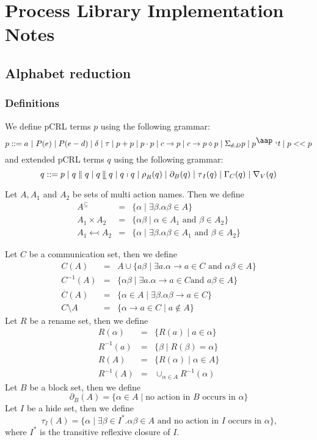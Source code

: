 \documentclass{article}
\begin{document}
\section{Process Library Implementation Notes}

\subsection{Alphabet reduction}

\subsubsection{Definitions}

We define pCRL terms $p$ using the following grammar:%
\[
p::=a\ \mathbf{|}\ P(e)\mid P(e-d)\mid \delta \mid \tau \mid p+p\mid p\cdot
p\mid c\rightarrow p\mid c\rightarrow p\diamond p\mid \Sigma _{d:D}p\mid p^{%
\mathbin{\mbox{\aap ,}}}t\mid p<<p 
\]%
and extended pCRL terms $q$ using the following grammar:%
\[
q::=p\mid q\parallel q\mid q\mathbin{\mathrel{\llfloor}}q\mid q\shortmid
q\mid \rho _{R}(q)\mid \partial _{B}(q)\mid \tau _{I}(q)\mid \Gamma
_{C}(q)\mid \nabla _{V}(q) 
\]

Let $A,A_{1}$ and $A_{2}$ be sets of multi action names. Then we define%
\begin{eqnarray*}
A^{\subseteq } &=&\{\alpha \mid \exists \beta .\alpha \beta \in A\} \\
A_{1}\times A_{2} &=&\{\alpha \beta \mid \alpha \in A_{1}\text{ and }\beta
\in A_{2}\} \\
A_{1}\leftarrowtail A_{2} &=&\{\alpha \mid \exists \beta .\alpha \beta \in
A_{1}\text{ and }\beta \in A_{2}\}
\end{eqnarray*}

Let $C$ be a communication set, then we define%
\begin{eqnarray*}
C(A) &=&A\cup \{a\beta \mid \exists a.\alpha \rightarrow a\in C\text{ and }%
\alpha \beta \in A\} \\
C^{-1}(A) &=&\{\alpha \beta \mid \exists a.\alpha \rightarrow a\in C\text{
and }a\beta \in A\} \\
\overline{C}(A) &=&\{\alpha \in A\mid \exists \beta .\alpha \beta
\rightarrow a\in C\} \\
C\setminus A &=&\{\alpha \rightarrow a\in C\mid a\notin A\}
\end{eqnarray*}%
Let $R$ be a rename set, then we define%
\begin{eqnarray*}
R(\alpha ) &=&\{R(a)\mid a\in \alpha \} \\
R^{-1}(a) &=&\{\beta \mid R(\beta )=\alpha \} \\
R(A) &=&\{R(\alpha )\mid \alpha \in A\} \\
R^{-1}(A) &=&\cup _{\alpha \in A}R^{-1}(\alpha )
\end{eqnarray*}%
Let $B$ be a block set, then we define%
\[
\partial _{B}(A)=\{\alpha \in A\mid \text{no action in }B\text{ occurs in }%
\alpha \} 
\]%
Let $I$ be a hide set, then we define%
\[
\tau _{I}(A)=\{\alpha \mid \exists \beta \in I^{\ast }.\alpha \beta \in A%
\text{ and no action in }I\text{ occurs in }\alpha \}\text{,} 
\]%
where $I^{\ast }$ is the transitive reflexive closure of $I$.\newpage
\end{document}
